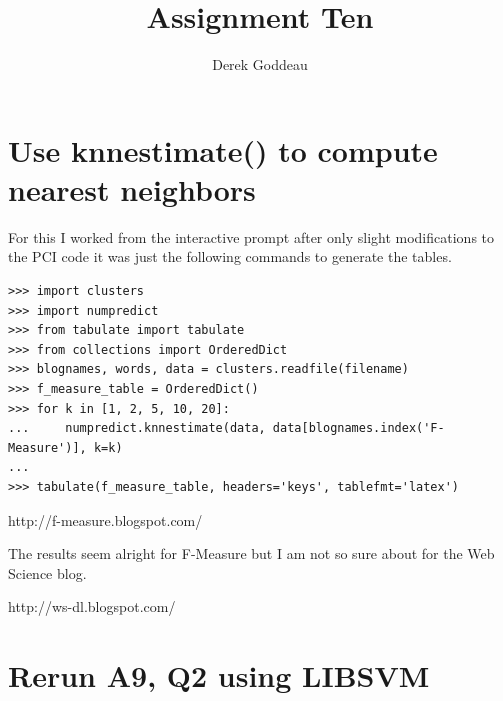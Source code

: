 \documentclass[12pt, a4paper]{article}
\author{Derek Goddeau}
\title{Assignment Ten}
\begin{document}
\maketitle

\newpage



\section{Use knnestimate() to compute nearest neighbors}
 
For this I worked from the interactive prompt after only slight modifications to the PCI code it was just the following commands to generate the tables.

\begin{minipage}{\linewidth} %
\vspace{2em}
\begin{verbatim}
>>> import clusters
>>> import numpredict
>>> from tabulate import tabulate
>>> from collections import OrderedDict
>>> blognames, words, data = clusters.readfile(filename)
>>> f_measure_table = OrderedDict()
>>> for k in [1, 2, 5, 10, 20]:
...     numpredict.knnestimate(data, data[blognames.index('F-Measure')], k=k)
...
>>> tabulate(f_measure_table, headers='keys', tablefmt='latex')
\end{verbatim}
\vspace{2em}
\end{minipage}

\begin{table}[ht]
\centering
\caption{http://f-measure.blogspot.com/}
\begin{adjustbox}{width=1\textwidth}
\small

\end{adjustbox}
\end{table}

\newpage
\noindent
The results seem alright for F-Measure but I am not so sure about for the Web Science blog.

\begin{table}[ht]
\centering
\caption{http://ws-dl.blogspot.com/}
\begin{adjustbox}{width=1\textwidth}
\small

\end{adjustbox}
\end{table}


\newpage
\section{Rerun A9, Q2 using LIBSVM}
\end{document}
